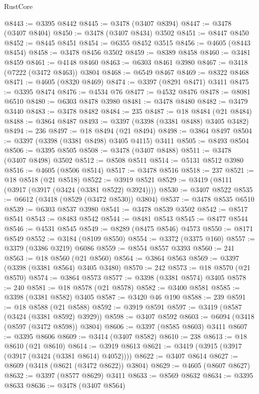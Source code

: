 \begin{lexlean}{RustCore}
\begin{coremodule}
@8443 := @3395 @8442
@8445 := @3478 (@3407 @8394)
@8447 := @3478 (@3407 @8404)
@8450 := @3478 (@3407 @8434) @3502
@8451 := @8447 @8450
@8452 := @8445 @8451
@8454 := @6355 @8452 @3515
@8456 := @4605 (@8443 @8454)
@8458 := @3478 @8456 @3502
@8459 := @8389 @8458
@8460 := @3481 @8459
@8461 := @4148 @8460
@8463 := @6303 @8461 @3980
@8467 := @3418 (@7222 (@3472 @8463)) @3804
@8468 := @6549 @8467
@8469 := @8322 @8468
@8471 := @4605 (@8320 @8469)
@8474 := @3397 (@8291 @8471) @3411
@8475 := @3395 @8474
@8476 := @4534 @76
@8477 := @4532 @8476
@8478 := @8081 @6510
@8480 := @6303 @8478 @3980
@8481 := @3478 @8480
@8482 := @3479 @3440
@8483 := @3478 @8482
@8484 := 235
@8487 := @18 @8484 (@21 @8484)
@8488 := @3864 @8487
@8493 := @3397 (@3398 (@3381 @8488) @3405 @3482)
@8494 := 236
@8497 := @18 @8494 (@21 @8494)
@8498 := @3864 @8497
@8504 := @3397 (@3398 (@3381 @8498) @3405 @4115) @3411
@8505 := @8493 @8504
@8506 := @3395 @8505
@8508 := @3478 (@3407 @8488)
@8511 := @3478 (@3407 @8498) @3502
@8512 := @8508 @8511
@8514 := @5131 @8512 @3980
@8516 := @4605 (@8506 @8514)
@8517 := @3478 @8516
@8518 := 237
@8521 := @18 @8518 (@21 @8518)
@8522 := @3919 @8521
@8529 := @3419 (@8111 (@3917 (@3917 (@3424 (@3381 @8522) @3924))))
@8530 := @3407 @8522
@8535 := @6612 (@3418 (@8529 (@3472 @8530)) @3804)
@8537 := @3478 @8535 @6510
@8539 := @6303 @8537 @3980
@8541 := @3478 @8539 @3502
@8542 := @8517 @8541
@8543 := @8483 @8542
@8544 := @8481 @8543
@8545 := @8477 @8544
@8546 := @4531 @8545
@8549 := @8289 (@8475 @8546) @4573
@8550 := @8171 @8549
@8552 := @3184 (@8109 @8550)
@8554 := @3372 (@3375 @160)
@8557 := @3379 (@3386 @3219) @6086
@8559 := @8554 @8557 @3393
@8560 := 241
@8563 := @18 @8560 (@21 @8560)
@8564 := @3864 @8563
@8569 := @3397 (@3398 (@3381 @8564) @3405 @3480)
@8570 := 242
@8573 := @18 @8570 (@21 @8570)
@8574 := @3864 @8573
@8577 := @3398 (@3381 @8574) @3405
@8578 := 240
@8581 := @18 @8578 (@21 @8578)
@8582 := @3400 @8581
@8585 := @3398 (@3381 @8582) @3405
@8587 := @3420 @46 @190
@8588 := 239
@8591 := @18 @8588 (@21 @8588)
@8592 := @3919 @8591
@8597 := @3419 (@8587 (@3424 (@3381 @8592) @3929))
@8598 := @3407 @8592
@8603 := @6094 (@3418 (@8597 (@3472 @8598)) @3804)
@8606 := @3397 (@8585 @8603) @3411
@8607 := @3395 @8606
@8609 := @3414 (@3407 @8582)
@8610 := 238
@8613 := @18 @8610 (@21 @8610)
@8614 := @3919 @8613
@8621 := @3419 (@3915 (@3917 (@3917 (@3424 (@3381 @8614) @4052))))
@8622 := @3407 @8614
@8627 := @8609 (@3418 (@8621 (@3472 @8622)) @3804)
@8629 := @4605 (@8607 @8627)
@8632 := @3397 (@8577 @8629) @3411
@8633 := @8569 @8632
@8634 := @3395 @8633
@8636 := @3478 (@3407 @8564)

\end{coremodule}
\end{lexlean}
